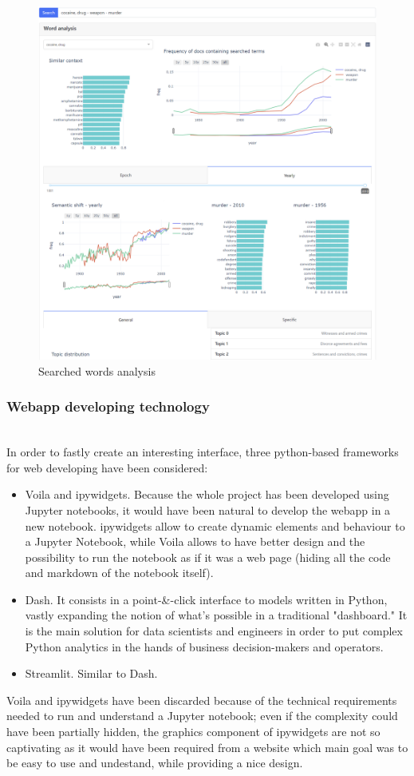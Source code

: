 \begin{figure}
\includegraphics[width=\textwidth]{images/webapp.png}
\caption{Searched words analysis} \label{fig4}
\end{figure}
\subsubsection{Webapp developing technology}\hfill\\
In order to fastly create an interesting interface, three python-based frameworks for web developing have been considered:
\begin{itemize}
    \item Voila and ipywidgets. Because the whole project has been developed using Jupyter notebooks, it would have
    been natural to develop the webapp in a new notebook. ipywidgets allow to create dynamic elements and behaviour to
    a Jupyter Notebook, while Voila allows to have better design and the possibility to run the notebook as if it was
    a web page (hiding all the code and markdown of the notebook itself).
    \item Dash. It consists in a point-&-click interface to models written in Python, vastly expanding the notion of
    what's possible in a traditional "dashboard." It is the main solution for data scientists and engineers in order to
    put complex Python analytics in the hands of business decision-makers and operators.
    \item Streamlit. Similar to Dash.
\end{itemize}
Voila and ipywidgets have been discarded because of the technical requirements needed to run and understand a Jupyter
notebook; even if the complexity could have been partially hidden, the graphics component of ipywidgets are not so
captivating as it would have been required from a website which main goal was to be easy to use and undestand, while
providing a nice design.

